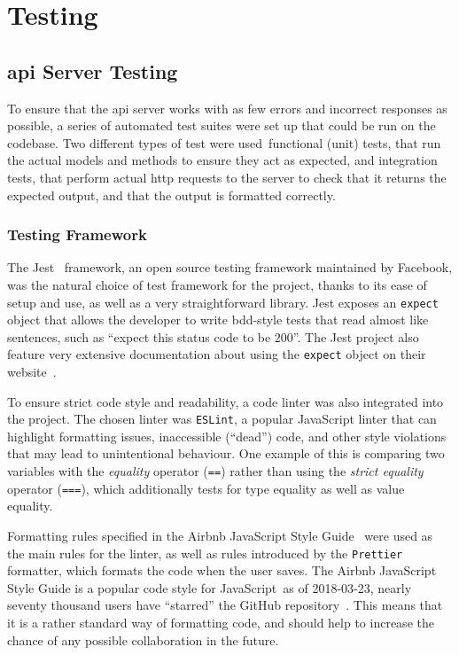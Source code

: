 \chapter{Testing}

\section{\acrshort{api} Server Testing}

To ensure that the \acrshort{api} server works with as few errors and
incorrect responses as possible, a series of automated test suites were set
up that could be run on the codebase. Two different types of test were
used\textemdash~functional (unit) tests, that run the actual models and
methods to ensure they act as expected, and integration tests, that perform
actual \acrshort{http} requests to the server to check that it returns the
expected output, and that the output is formatted correctly.

\subsection{Testing Framework}
The Jest~\cite{jest} framework, an open source testing framework maintained
by Facebook, was the natural choice of test framework for the project, thanks
to its ease of setup and use, as well as a very straightforward library. Jest
exposes an \texttt{expect} object that allows the developer to write
\acrfull{bdd}-style tests that read almost like sentences, such as ``expect
this status code to be 200''. The Jest project also feature very extensive
documentation about using the \texttt{expect} object on their
website~\cite{jest-expect}.

To ensure strict code style and readability, a code linter was also
integrated into the project. The chosen linter was \texttt{ESLint}, a popular
JavaScript linter that can highlight formatting issues, inaccessible
(``dead'') code, and other style violations that may lead to unintentional
behaviour. One example of this is comparing two variables with the
\textit{equality} operator (\texttt{==}) rather than using the \textit{strict
equality} operator (\texttt{===}), which additionally tests for type equality
as well as value equality.

Formatting rules specified in the Airbnb JavaScript Style
Guide~\cite{airbnb-javascript} were used as the main rules for the linter, as
well as rules introduced by the \texttt{Prettier} formatter, which formats
the code when the user saves. The Airbnb JavaScript Style Guide is a popular
code style for JavaScript\textemdash~as of 2018-03-23, nearly seventy
thousand users have ``starred'' the GitHub
repository~\cite{airbnb-javascript}. This means that it is a rather standard
way of formatting code, and should help to increase the chance of any
possible collaboration in the future.

